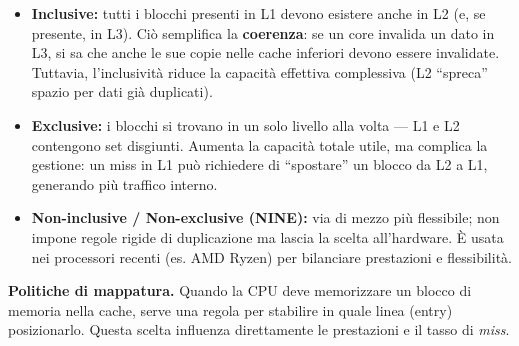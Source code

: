 \begin{itemize}
  \item \textbf{Inclusive:} tutti i blocchi presenti in L1 devono esistere anche in L2 (e, se presente, in L3).  
        Ciò semplifica la \textbf{coerenza}: se un core invalida un dato in L3, si sa che anche le sue copie nelle cache inferiori devono essere invalidate.  
        Tuttavia, l’inclusività riduce la capacità effettiva complessiva (L2 “spreca” spazio per dati già duplicati).
  \item \textbf{Exclusive:} i blocchi si trovano in un solo livello alla volta — L1 e L2 contengono set disgiunti.  
        Aumenta la capacità totale utile, ma complica la gestione: un miss in L1 può richiedere di “spostare” un blocco da L2 a L1, generando più traffico interno.
  \item \textbf{Non-inclusive / Non-exclusive (NINE):} via di mezzo più flessibile; non impone regole rigide di duplicazione ma lascia la scelta all’hardware.  
        È usata nei processori recenti (es. AMD Ryzen) per bilanciare prestazioni e flessibilità.
\end{itemize}

\textbf{Politiche di mappatura.}  
Quando la CPU deve memorizzare un blocco di memoria nella cache, serve una regola per stabilire in quale linea (entry) posizionarlo.  
Questa scelta influenza direttamente le prestazioni e il tasso di \emph{miss}.

